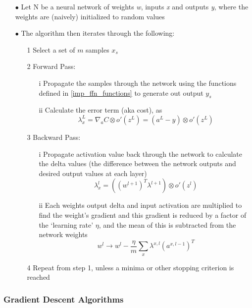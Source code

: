 \documentclass[a4paper,latin]{paper}
\begin{document}
\begin{itemize}
	\item[$\bullet$]  Let N be a neural network of weights \textit{w}, inputs \textit{x} and outputs \textit{y}, where the weights are (naively) initialized to random values
	\item[$\bullet$] The algorithm then iterates through the following:
	\begin{itemize}
		\item[1] Select a set of $m$ samples $x_s$
		\item[2]Forward Pass:
		\begin{itemize}
			\item[i] Propagate the samples through the network using the functions defined in \ref{imp_ffn_functions} to generate out output $y_s$
			\item[ii] Calculate the error term (aka cost), as
			\begin{equation}
				\lambda^L_x = \nabla_a C \otimes o'(z^L) = (a^L - y) \otimes o'(z^L)
			\end{equation}
		\end{itemize}
		\item[3]Backward Pass:
		\begin{itemize}
			\item[i] Propagate activation value back through the network to calculate the delta values (the difference between the network outputs and desired output values at each layer)
			\begin{equation}
			\lambda^l_x = ((w^{l+1})^T\lambda^{l+1})  \otimes o'(z^l)
			\end{equation}
			\item[ii] Each weights output delta and input activation are multiplied to find the weight’s gradient and this gradient is reduced by a factor of the ‘learning rate’ $\eta$, and the mean of this is subtracted from the network weights
			\begin{equation}
			w^l \rightarrow w^l - \frac{\eta}{m} \sum_{x} \lambda^{x, l} (a^{x, l - 1})^T
			\end{equation}
		\end{itemize}
		\item[4] Repeat from step 1, unless a minima or other stopping criterion is reached
		
	\end{itemize}
\end{itemize}

\subsubsection{Gradient Descent Algorithms}\label{imp_sgd}
\end{document}
